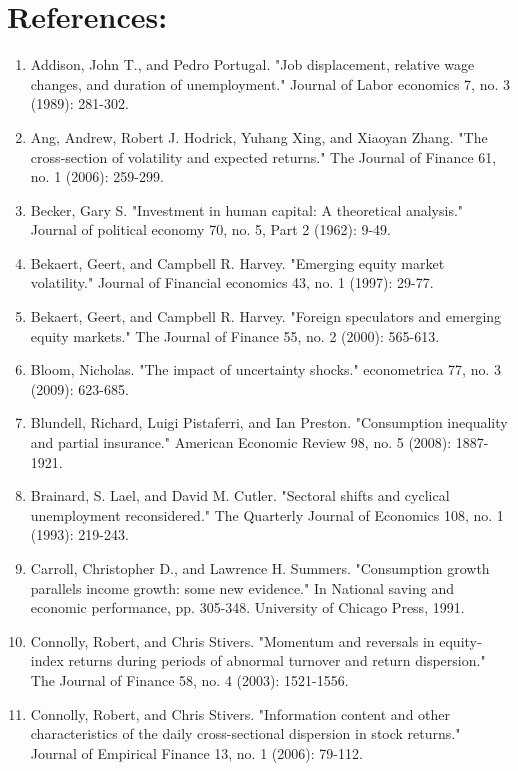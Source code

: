 \documentclass[12pt]{article}
\begin{document}
\newpage
\section{References:}
\begin{enumerate}

    \item{Addison, John T., and Pedro Portugal. "Job displacement, relative wage changes, and duration of unemployment." Journal of Labor economics 7, no. 3 (1989): 281-302.}
    \item{Ang, Andrew, Robert J. Hodrick, Yuhang Xing, and Xiaoyan Zhang. "The cross‐section of volatility and expected returns." The Journal of Finance 61, no. 1 (2006): 259-299.}
    \item{Becker, Gary S. "Investment in human capital: A theoretical analysis." Journal of political economy 70, no. 5, Part 2 (1962): 9-49.}
    \item{Bekaert, Geert, and Campbell R. Harvey. "Emerging equity market volatility." Journal of Financial economics 43, no. 1 (1997): 29-77.}
    \item{Bekaert, Geert, and Campbell R. Harvey. "Foreign speculators and emerging equity markets." The Journal of Finance 55, no. 2 (2000): 565-613.}
    \item{Bloom, Nicholas. "The impact of uncertainty shocks." econometrica 77, no. 3 (2009): 623-685.}
    \item{Blundell, Richard, Luigi Pistaferri, and Ian Preston. "Consumption inequality and partial insurance." American Economic Review 98, no. 5 (2008): 1887-1921.}
    \item{Brainard, S. Lael, and David M. Cutler. "Sectoral shifts and cyclical unemployment reconsidered." The Quarterly Journal of Economics 108, no. 1 (1993): 219-243.}
    \item{Carroll, Christopher D., and Lawrence H. Summers. "Consumption growth parallels income growth: some new evidence." In National saving and economic performance, pp. 305-348. University of Chicago Press, 1991.}
    \item{Connolly, Robert, and Chris Stivers. "Momentum and reversals in equity‐index returns during periods of abnormal turnover and return dispersion." The Journal of Finance 58, no. 4 (2003): 1521-1556.}
    \item{Connolly, Robert, and Chris Stivers. "Information content and other characteristics of the daily cross-sectional dispersion in stock returns." Journal of Empirical Finance 13, no. 1 (2006): 79-112.}

\end{enumerate}
\end{document}
